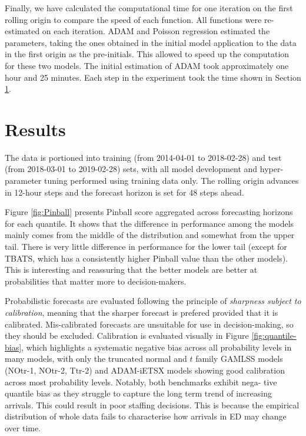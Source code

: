 \documentclass[]{elsarticle} %
\begin{document}
Finally, we have calculated the computational time for one iteration on
the first rolling origin to compare the speed of each function. All
functions were re-estimated on each iteration. ADAM and Poisson
regression estimated the parameters, taking the ones obtained in the
initial model application to the data in the first origin as the
pre-initials. This allowed to speed up the computation for these two
models. The initial estimation of ADAM took approximately one hour and
25 minutes. Each step in the experiment took the time shown in Section
\ref{result}.

\hypertarget{result}{%
\section{Results}\label{result}}

The data is portioned into training (from 2014-04-01 to 2018-02-28) and
test (from 2018-03-01 to 2019-02-28) sets, with all model development
and hyper-parameter tuning performed using training data only. The
rolling origin advances in 12-hour steps and the forecast horizon is set
for 48 steps ahead.

Figure \ref{fig:Pinball} presents Pinball score aggregated across
forecasting horizons for each quantile. It shows that the difference in
performance among the models mainly comes from the middle of the
distribution and somewhat from the upper tail. There is very little
difference in performance for the lower tail (except for TBATS, which
has a consistently higher Pinball value than the other models). This is
interesting and reassuring that the better models are better at
probabilities that matter more to decision-makers.

Probabilistic forecasts are evaluated following the principle of
\emph{sharpness subject to calibration}, meaning that the sharper forecast is
prefered provided that it is calibrated. Mis-calibrated forecasts are
unsuitable for use in decision-making, so they should be excluded.
Calibration is evaluated visually in Figure \ref{fig:quantile-bias},
which highlights a systematic negative bias across all probability
levels in many models, with only the truncated normal and \(t\) family
GAMLSS models (NOtr-1, NOtr-2, Ttr-2) and ADAM-iETSX models showing good
calibration across most probability levels. Notably, both benchmarks exhibit nega-
tive quantile bias as they struggle to capture the long term trend of increasing arrivals.
This could result in poor staffing decisions. This is because the empirical distribution of
whole data fails to characterise how arrivals in ED may change over time.
\end{document}
